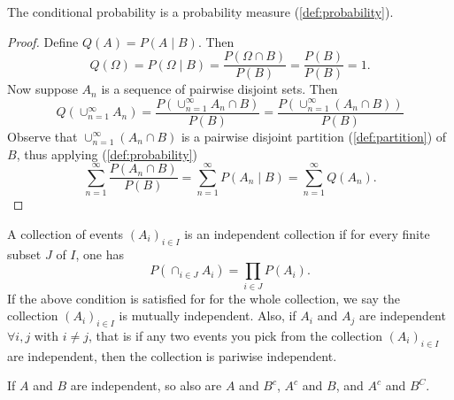 \documentclass[../main.tex]{subfiles}
\begin{document}
\begin{proposition}\label{prop:conditional prob is a prob measure}
The conditional probability is a probability measure (\ref{def:probability}).
\end{proposition}

\begin{proof}
Define $Q(A) = P(A\mid B)$. Then \[
Q(\Omega) = P(\Omega \mid B) = \frac{P(\Omega \cap B)}{P(B)} = \frac{P(B)}{P(B)} = 1.
\]
Now suppose $A_n$ is a sequence of pairwise disjoint sets. Then
\[
Q(\cup^\infty_{n=1}{A_n}) = \frac{P(\cup^\infty_{n=1}{A_n} \cap B)}{P(B)} = \frac{P(\cup^\infty_{n=1}{(A_n \cap B)})}{P(B)}
\]
Observe that $\cup^\infty_{n=1}{(A_n \cap B)}$ is a pairwise disjoint partition (\ref{def:partition}) of $B$, thus applying (\ref{def:probability})
\[
\sum^\infty_{n=1}{\frac{P(A_n \cap B)}{P(B)}} = \sum^\infty_{n=1}{P(A_n\mid B)} = \sum^\infty_{n=1}{Q(A_n)}.
\]
\end{proof}






\begin{definition}\label{def: independence}
A collection of events $(A_i)_{i \in I}$ is an independent collection if for every finite subset $J$ of $I$, one has 
\[
P(\cap_{i \in J}{A_i}) = \prod_{i \in J}{P(A_i)}.
\]
If the above condition is satisfied for for the whole collection, we say the collection $(A_i)_{i \in I}$ is mutually independent. Also, 
if $A_i$ and $A_j$ are independent $\forall i,j$ with $i \neq j$, that is if any two events you pick from the collection $(A_i)_{i \in I}$ are independent, then the collection is pariwise independent.

\end{definition}



\begin{exercise}
If $A$ and $B$ are independent, so also are $A$ and $B^c$, $A^c$ and $B$, and $A^c$ and $B^C$. 
\end{exercise}
\end{document}
